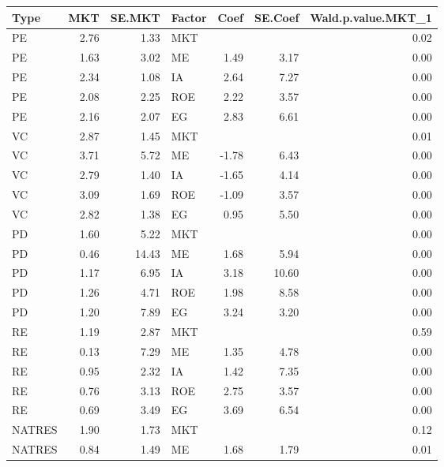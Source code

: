 \documentclass[12pt]{article}
\begin{document}








\newpage



\begin{table}[ht]
	\centering
	\begin{tabular}{lrrlrrr}
		Type & MKT & SE.MKT & Factor & Coef & SE.Coef & Wald.p.value.MKT\_1 \\ 
		\hline
		\hline
		PE & 2.76 & 1.33 & MKT &  &  & 0.02 \\ 
		PE & 1.63 & 3.02 & ME & 1.49 & 3.17 & 0.00 \\ 
		PE & 2.34 & 1.08 & IA & 2.64 & 7.27 & 0.00 \\ 
		PE & 2.08 & 2.25 & ROE & 2.22 & 3.57 & 0.00 \\ 
		PE & 2.16 & 2.07 & EG & 2.83 & 6.61 & 0.00 \\
		\hline
		VC & 2.87 & 1.45 & MKT &  &  & 0.01 \\ 
		VC & 3.71 & 5.72 & ME & -1.78 & 6.43 & 0.00 \\ 
		VC & 2.79 & 1.40 & IA & -1.65 & 4.14 & 0.00 \\ 
		VC & 3.09 & 1.69 & ROE & -1.09 & 3.57 & 0.00 \\ 
		VC & 2.82 & 1.38 & EG & 0.95 & 5.50 & 0.00 \\ 
		\hline
		PD & 1.60 & 5.22 & MKT &  &  & 0.00 \\ 
		PD & 0.46 & 14.43 & ME & 1.68 & 5.94 & 0.00 \\ 
		PD & 1.17 & 6.95 & IA & 3.18 & 10.60 & 0.00 \\ 
		PD & 1.26 & 4.71 & ROE & 1.98 & 8.58 & 0.00 \\ 
		PD & 1.20 & 7.89 & EG & 3.24 & 3.20 & 0.00 \\ 
		\hline
		RE & 1.19 & 2.87 & MKT &  &  & 0.59 \\ 
		RE & 0.13 & 7.29 & ME & 1.35 & 4.78 & 0.00 \\ 
		RE & 0.95 & 2.32 & IA & 1.42 & 7.35 & 0.00 \\ 
		RE & 0.76 & 3.13 & ROE & 2.75 & 3.57 & 0.00 \\ 
		RE & 0.69 & 3.49 & EG & 3.69 & 6.54 & 0.00 \\ 
		\hline
		NATRES & 1.90 & 1.73 & MKT &  &  & 0.12 \\ 
		NATRES & 0.84 & 1.49 & ME & 1.68 & 1.79 & 0.01 \\ 

\end{tabular}
\end{table}
\end{document}
